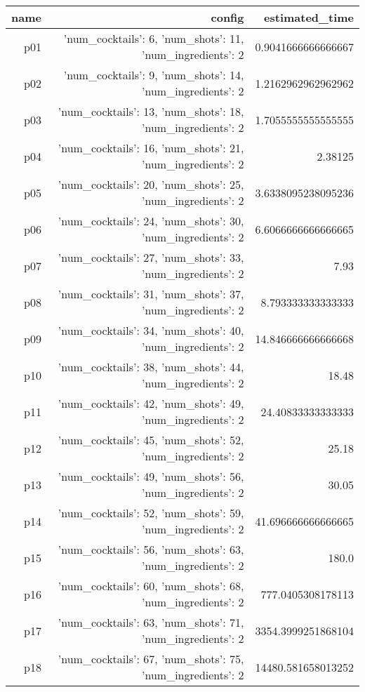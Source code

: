 \documentclass{article}
\begin{document}
                            \begin{center}
                            \scriptsize
                            \begin{tabular}{r|r|r}
                            name & config & estimated\_time\\\midrule
                              p01&{'num\_cocktails': 6, 'num\_shots': 11, 'num\_ingredients': 2}&0.9041666666666667\\
  p02&{'num\_cocktails': 9, 'num\_shots': 14, 'num\_ingredients': 2}&1.2162962962962962\\
  p03&{'num\_cocktails': 13, 'num\_shots': 18, 'num\_ingredients': 2}&1.7055555555555555\\
  p04&{'num\_cocktails': 16, 'num\_shots': 21, 'num\_ingredients': 2}&2.38125\\
  p05&{'num\_cocktails': 20, 'num\_shots': 25, 'num\_ingredients': 2}&3.6338095238095236\\
  p06&{'num\_cocktails': 24, 'num\_shots': 30, 'num\_ingredients': 2}&6.6066666666666665\\
  p07&{'num\_cocktails': 27, 'num\_shots': 33, 'num\_ingredients': 2}&7.93\\
  p08&{'num\_cocktails': 31, 'num\_shots': 37, 'num\_ingredients': 2}&8.793333333333333\\
  p09&{'num\_cocktails': 34, 'num\_shots': 40, 'num\_ingredients': 2}&14.846666666666668\\
  p10&{'num\_cocktails': 38, 'num\_shots': 44, 'num\_ingredients': 2}&18.48\\
  p11&{'num\_cocktails': 42, 'num\_shots': 49, 'num\_ingredients': 2}&24.40833333333333\\
  p12&{'num\_cocktails': 45, 'num\_shots': 52, 'num\_ingredients': 2}&25.18\\
  p13&{'num\_cocktails': 49, 'num\_shots': 56, 'num\_ingredients': 2}&30.05\\
  p14&{'num\_cocktails': 52, 'num\_shots': 59, 'num\_ingredients': 2}&41.696666666666665\\
  p15&{'num\_cocktails': 56, 'num\_shots': 63, 'num\_ingredients': 2}&180.0\\
  p16&{'num\_cocktails': 60, 'num\_shots': 68, 'num\_ingredients': 2}&777.0405308178113\\
  p17&{'num\_cocktails': 63, 'num\_shots': 71, 'num\_ingredients': 2}&3354.3999251868104\\
  p18&{'num\_cocktails': 67, 'num\_shots': 75, 'num\_ingredients': 2}&14480.581658013252\\

\end{tabular}
\end{center}
\end{document}
